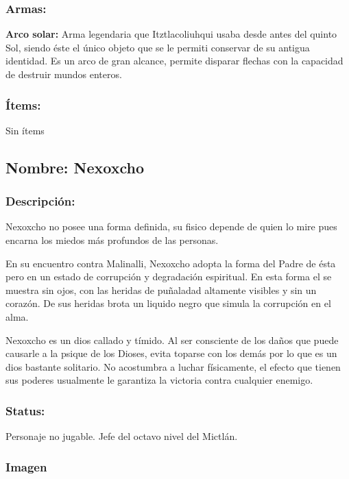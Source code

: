 \documentclass[11pt,letterpaper]{article}
\begin{document}
\subsubsection{Armas:}
\textbf{Arco solar:} Arma legendaria que Itztlacoliuhqui usaba desde antes del quinto Sol, siendo éste el único objeto que se le permiti conservar de su antigua identidad. Es un arco de gran alcance, permite disparar flechas con la capacidad de destruir mundos enteros. 
\subsubsection{Ítems:}
Sin ítems

\subsection{Nombre: Nexoxcho}  
\subsubsection{Descripción:}
Nexoxcho no posee una forma definida, su fisico depende de quien lo mire pues encarna los miedos más profundos de las personas.
\\
\par
En su encuentro contra Malinalli, Nexoxcho adopta la forma del Padre de ésta pero en un estado de corrupción y degradación espiritual. En esta forma el se muestra sin ojos, con las heridas de puñaladad altamente visibles y sin un corazón. De sus heridas brota un liquido negro que simula la corrupción en el alma. 
\\
\par
Nexoxcho es un dios callado y tímido. Al ser consciente de los daños que puede causarle a la psique de los Dioses, evita toparse con los demás por lo que es un dios bastante solitario. No acostumbra a luchar físicamente, el efecto que tienen sus poderes usualmente le garantiza la victoria contra cualquier enemigo.         
\subsubsection{Status:}
Personaje no jugable.
Jefe del octavo nivel del Mictlán.
\subsubsection{Imagen}
\end{document}
